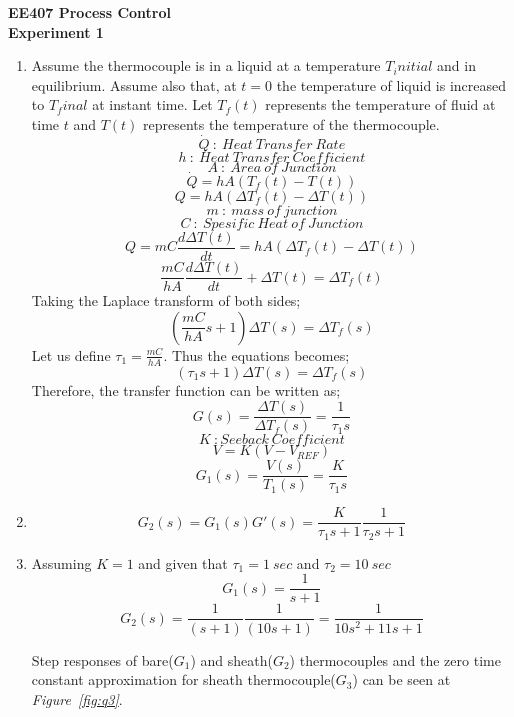 \documentclass[a4paper,12pt]{article}
\begin{document}
\begin{center}
	\textbf{\large EE407 Process Control \\[0.2cm] Experiment 1} \\
\end{center}

\begin{enumerate}
	\item Assume the thermocouple is in a liquid at a temperature $T_initial$ and in equilibrium. Assume also that, at $t=0$ the temperature of liquid is increased to $T_final$ at instant time.
	Let $T_f(t)$ represents the temperature of fluid at time $t$ and $T(t)$ represents the temperature of the thermocouple. 	
	$$ \dot{Q}\ :\ Heat\ Transfer\ Rate $$
	$$ h\ :\ Heat\ Transfer\ Coefficient$$
	$$A\ :\ Area\ of\ Junction$$	
	$$ \dot{Q}=hA(T_f(t)-T(t))$$
	$$	Q=hA(\Delta T_f(t)- \Delta T(t) )$$
	$$ m\ :\ mass\ of\ junction$$
	$$ C\ :\ Spesific\ Heat\ of\ Junction $$	
	$$ 	Q= mC\frac{d\Delta T(t)}{dt}=hA(\Delta T_f(t)- \Delta T(t)) $$
	$$ \frac{mC}{hA}\frac{d\Delta T(t)}{dt}+\Delta T(t)=\Delta T_f(t)$$
	Taking the Laplace transform of both sides;
	$$ \left( \frac{mC}{hA}s+1\right)\Delta T(s)=\Delta T_f(s)$$
	Let us define $\tau_1 =\frac{mC}{hA} $. Thus the equations becomes;
	$$ \left( \tau_1 s+1\right)\Delta T(s)=\Delta T_f(s)$$
	Therefore, the transfer function can be written as;
	$$	G(s)=\frac{\Delta T(s)}{\Delta T_f(s)}= \frac{1}{\tau_1s}	$$
	$$ K\ :Seeback\ Coefficient$$
	$$ V=K(V-V_{REF})$$
	$$ \boxed{ G_1(s)=\frac{V(s)}{T_1(s)} =\frac{K}{\tau_1 s} }$$
	
	\item
		$$ \boxed{ G_2(s)=G_1(s)G'(s)=\frac{K}{\tau_1 s+1}\frac{1}{\tau_2 s+1} }$$
		
	\item Assuming $K=1$ and given that $\tau_1=1\ sec$ and $\tau_2=10\ sec$
		$$ G_1(s)=\frac{1}{s+1}	$$
		$$ G_2(s)=\frac{1}{(s+1)}\frac{1}{(10 s+1)}=\frac{1}{10s^2+11s+1}$$

		Step responses of bare($G_1$) and sheath($G_2$) thermocouples and the zero time constant approximation for sheath thermocouple($G_3$) can be seen at \textit{Figure~\ref{fig:q3}}.
		

\end{enumerate}
\end{document}

